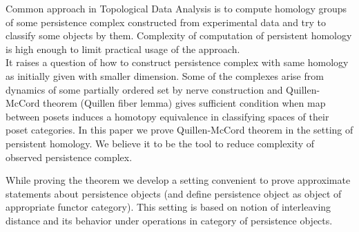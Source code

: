Common approach in Topological Data Analysis is to compute homology groups of some persistence complex constructed from experimental data and try to classify some objects by them. Complexity of computation of persistent homology is high enough to limit practical usage of the approach.\\

It raises a question of how to construct persistence complex with same homology as initially given with smaller dimension. Some of the complexes arise from dynamics of some partially ordered set by nerve construction and Quillen-McCord theorem (Quillen fiber lemma) gives sufficient condition when map between posets induces a homotopy equivalence in classifying spaces of their poset categories. In this paper we prove Quillen-McCord theorem in the setting of persistent homology. We believe it to be the tool to reduce complexity of observed persistence complex.

While proving the theorem we develop a setting convenient to prove approximate statements about persistence objects (and define persistence object as object of appropriate functor category). This setting is based on notion of interleaving distance and its behavior under operations in category of persistence objects.
